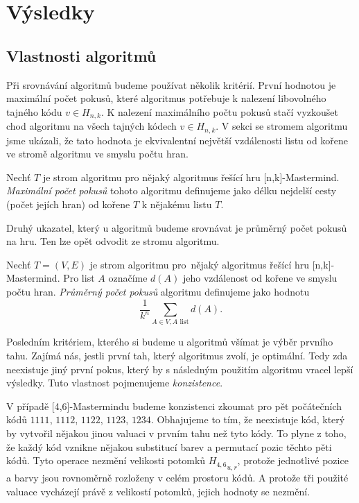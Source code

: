 \chapter{Výsledky}

\section{Vlastnosti algoritmů}
Při srovnávání algoritmů budeme používat několik kritérií. První hodnotou je maximální počet pokusů, které algoritmus potřebuje k nalezení libovolného tajného kódu $v \in H_{n,k}$. K nalezení maximálního počtu pokusů stačí vyzkoušet chod algoritmu na všech tajných kódech $v \in H_{n,k}$. V sekci se stromem algoritmu jsme ukázali, že tato hodnota je ekvivalentní největší vzdálenosti listu od kořene ve stromě algoritmu ve smyslu počtu hran.

\begin{definice}\label{defmaxpocetpokusu}
    Nechť $T$ je strom algoritmu pro nějaký algoritmus řešící hru [n,k]-Mastermind. \emph{Maximální počet pokusů} tohoto algoritmu definujeme jako délku nejdelší cesty (počet jejích hran) od kořene $T$ k nějakému listu $T$. 
\end{definice}

Druhý ukazatel, který u algoritmů budeme srovnávat je průměrný počet pokusů na hru. Ten lze opět odvodit ze stromu algoritmu.

\begin{definice}\label{defprumpocetpokusu}
    Nechť $T = (V,E)$ je strom algoritmu pro~nějaký algoritmus řešící hru [n,k]-Mastermind. Pro list $A$ označíme $d(A)$ jeho vzdálenost od kořene ve smyslu počtu hran. \emph{Průměrný počet pokusů} algoritmu definujeme jako hodnotu
    \[\frac{1}{k^n}\sum_{A\in V, A \text{ list}} d(A).\]
\end{definice}

Posledním kritériem, kterého si budeme u algoritmů všímat je výběr prvního tahu. Zajímá nás, jestli první tah, který algoritmus zvolí, je optimální. Tedy zda neexistuje jiný první pokus, který by s následným použitím algoritmu vracel lepší výsledky. Tuto vlastnost pojmenujeme \emph{konzistence}.

V případě [4,6]-Mastermindu budeme konzistenci zkoumat pro pět počátečních kódů $1111$, $1112$, $1122$, $1123$, $1234$. Obhajujeme to tím, že neexistuje kód, který by vytvořil nějakou jinou valuaci v prvním tahu než tyto kódy. To plyne z toho, že každý kód vznikne nějakou substitucí barev a permutací pozic těchto pěti kódů. Tyto operace nezmění velikosti potomků ${H_{4,6}}_{u,r}$, protože jednotlivé pozice a barvy jsou rovnoměrně rozloženy v celém prostoru kódů. A protože tři použité valuace vycházejí právě z velikostí potomků, jejich hodnoty se nezmění.

